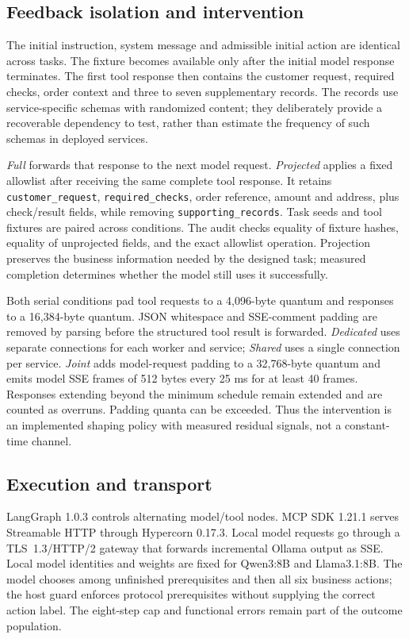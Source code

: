 \subsection{Feedback isolation and intervention}
The initial instruction, system message and admissible initial action are identical across tasks. The fixture becomes available only after the initial model response terminates. The first tool response then contains the customer request, required checks, order context and three to seven supplementary records. The records use service-specific schemas with randomized content; they deliberately provide a recoverable dependency to test, rather than estimate the frequency of such schemas in deployed services.

\emph{Full} forwards that response to the next model request. \emph{Projected} applies a fixed allowlist after receiving the same complete tool response. It retains \texttt{customer\_request}, \texttt{required\_checks}, order reference, amount and address, plus check/result fields, while removing \texttt{supporting\_records}. Task seeds and tool fixtures are paired across conditions. The audit checks equality of fixture hashes, equality of unprojected fields, and the exact allowlist operation. Projection preserves the business information needed by the designed task; measured completion determines whether the model still uses it successfully.

Both serial conditions pad tool requests to a 4,096-byte quantum and responses to a 16,384-byte quantum. JSON whitespace and SSE-comment padding are removed by parsing before the structured tool result is forwarded. \emph{Dedicated} uses separate connections for each worker and service; \emph{Shared} uses a single connection per service. \emph{Joint} adds model-request padding to a 32,768-byte quantum and emits model SSE frames of 512 bytes every 25 ms for at least 40 frames. Responses extending beyond the minimum schedule remain extended and are counted as overruns. Padding quanta can be exceeded. Thus the intervention is an implemented shaping policy with measured residual signals, not a constant-time channel.

\subsection{Execution and transport}
LangGraph 1.0.3 controls alternating model/tool nodes. MCP SDK 1.21.1 serves Streamable HTTP through Hypercorn 0.17.3. Local model requests go through a TLS~1.3/HTTP/2 gateway that forwards incremental Ollama output as SSE. Local model identities and weights are fixed for Qwen3:8B and Llama3.1:8B. The model chooses among unfinished prerequisites and then all six business actions; the host guard enforces protocol prerequisites without supplying the correct action label. The eight-step cap and functional errors remain part of the outcome population.

